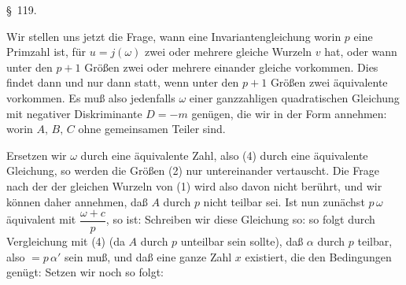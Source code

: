 
\S\ 119. 

Wir stellen uns jetzt die Frage, wann eine Invariantengleichung
worin $p$ eine Primzahl ist, für $u = j(\omega)$ zwei oder mehrere gleiche Wurzeln $v$ hat, oder wann unter den $p+1$ Größen
zwei oder mehrere einander gleiche vorkommen. Dies findet dann und nur dann statt, wenn unter den $p+1$ Größen
zwei äquivalente vorkommen. Es muß also jedenfalls $\omega$ einer ganzzahligen quadratischen Gleichung mit negativer Diskriminante $D=-m$ genügen, die wir in der Form annehmen:
worin $A,\,B,\,C$ ohne gemeinsamen Teiler sind.

Ersetzen wir $\omega$ durch eine äquivalente Zahl, also (4) durch eine äquivalente Gleichung, so werden die Größen (2) nur untereinander vertauscht. Die Frage nach der  der gleichen Wurzeln von (1) wird also davon nicht berührt, und wir können daher annehmen, daß $A$ durch $p$ nicht teilbar sei. Ist nun zunächst $p\,\omega$ äquivalent mit $\dfrac{\omega+c}{p}$, so ist:
Schreiben wir diese Gleichung so:
so folgt durch Vergleichung mit (4) (da $A$ durch $p$ unteilbar sein sollte), daß $\alpha$ durch $p$ teilbar, also $=p\,\alpha'$ sein muß, und daß eine ganze Zahl $x$ existiert, die den Bedingungen genügt:
Setzen wir noch
so folgt:
